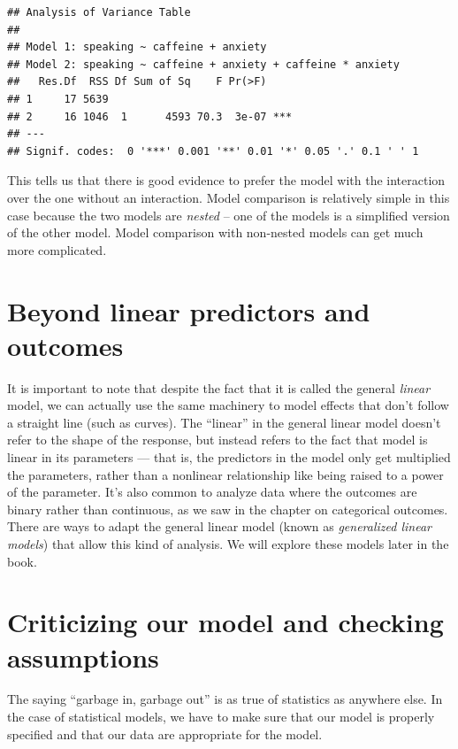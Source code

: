 \documentclass[12pt,]{book}
\theoremstyle{definition}
\theoremstyle{definition}
\theoremstyle{definition}
\theoremstyle{remark}
\begin{document}
\begin{verbatim}
## Analysis of Variance Table
## 
## Model 1: speaking ~ caffeine + anxiety
## Model 2: speaking ~ caffeine + anxiety + caffeine * anxiety
##   Res.Df  RSS Df Sum of Sq    F Pr(>F)    
## 1     17 5639                             
## 2     16 1046  1      4593 70.3  3e-07 ***
## ---
## Signif. codes:  0 '***' 0.001 '**' 0.01 '*' 0.05 '.' 0.1 ' ' 1
\end{verbatim}

This tells us that there is good evidence to prefer the model with the interaction over the one without an interaction. Model comparison is relatively simple in this case because the two models are \emph{nested} -- one of the models is a simplified version of the other model. Model comparison with non-nested models can get much more complicated.

\hypertarget{beyond-linear-predictors-and-outcomes}{%
\section{Beyond linear predictors and outcomes}\label{beyond-linear-predictors-and-outcomes}}

It is important to note that despite the fact that it is called the general \emph{linear} model, we can actually use the same machinery to model effects that don't follow a straight line (such as curves). The ``linear'' in the general linear model doesn't refer to the shape of the response, but instead refers to the fact that model is linear in its parameters --- that is, the predictors in the model only get multiplied the parameters, rather than a nonlinear relationship like being raised to a power of the parameter. It's also common to analyze data where the outcomes are binary rather than continuous, as we saw in the chapter on categorical outcomes. There are ways to adapt the general linear model (known as \emph{generalized linear models}) that allow this kind of analysis. We will explore these models later in the book.

\hypertarget{model-criticism}{%
\section{Criticizing our model and checking assumptions}\label{model-criticism}}

The saying ``garbage in, garbage out'' is as true of statistics as anywhere else. In the case of statistical models, we have to make sure that our model is properly specified and that our data are appropriate for the model.
\end{document}
